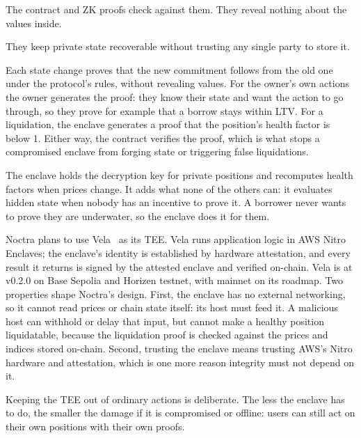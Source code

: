\documentclass[11pt,a4paper]{article}
\begin{document}
\begin{description}[leftmargin=0pt, labelsep=0.5em]
  \item[Commitments give integrity.] The contract and ZK proofs check against them. They reveal nothing about the
        values inside.
  \item[Ciphertexts give availability.] They keep private state recoverable without trusting any single party to
        store it.
  \item[ZK proofs give correctness.] Each state change proves that the new commitment follows from the old one
        under the protocol's rules, without revealing values. For the owner's own actions the owner generates
        the proof: they know their state and want the action to go through, so they prove for example that a
        borrow stays within LTV. For a liquidation, the enclave generates a proof that the position's health
        factor is below 1. Either way, the contract verifies the proof, which is what stops a compromised
        enclave from forging state or triggering false liquidations.
  \item[The TEE gives hidden monitoring.] The enclave holds the decryption key for private positions and
        recomputes health factors when prices change. It adds what none of the others can: it evaluates hidden
        state when nobody has an incentive to prove it. A borrower never wants to prove they are underwater,
        so the enclave does it for them.
\end{description}
Noctra plans to use Vela~\citep{veladocs} as its TEE. Vela runs application logic in AWS Nitro Enclaves; the
enclave's identity is established by hardware attestation, and every result it returns is signed by the attested
enclave and verified on-chain. Vela is at v0.2.0 on Base Sepolia and Horizen testnet, with mainnet on its
roadmap. Two properties shape Noctra's design. First, the enclave has no external networking, so it cannot read
prices or chain state itself: its host must feed it. A malicious host can withhold or delay that input, but
cannot make a healthy position liquidatable, because the liquidation proof is checked against the prices and
indices stored on-chain. Second, trusting the enclave means trusting AWS's Nitro hardware and attestation, which
is one more reason integrity must not depend on it.

Keeping the TEE out of ordinary actions is deliberate. The less the enclave has to do, the smaller the damage
if it is compromised or offline: users can still act on their own positions with their own proofs.
\end{document}
